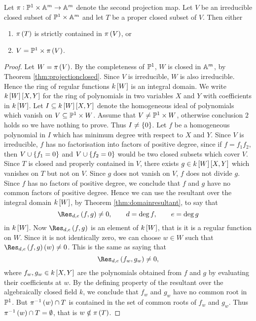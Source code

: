 \begin{lemma}
\label{lem:projectioneither}
Let $ \pi : \PP^1 \times \AA^m \to \AA^m $ denote the second projection map. Let $ V $ be an irreducible closed subset of $ \PP^1 \times \AA^m $ and let $ T $ be a proper closed subset of $ V $. Then either
\begin{enumerate}
\item $ \pi\br{T} $ is strictly contained in $ \pi\br{V} $, or
\item $ V = \PP^1 \times \pi\br{V} $.
\end{enumerate}
\end{lemma}

\pagebreak

\begin{proof}
Let $ W = \pi\br{V} $. By the completeness of $ \PP^1 $, $ W $ is closed in $ \AA^m $, by Theorem \ref{thm:projectionclosed}. Since $ V $ is irreducible, $ W $ is also irreducible. Hence the ring of regular functions $ k\sbr{W} $ is an integral domain. We write $ k\sbr{W}\sbr{X, Y} $ for the ring of polynomials in two variables $ X $ and $ Y $ with coefficients in $ k\sbr{W} $. Let $ I \subseteq k\sbr{W}\sbr{X, Y} $ denote the homogeneous ideal of polynomials which vanish on $ V \subseteq \PP^1 \times W $. Assume that $ V \ne \PP^1 \times W $, otherwise conclusion $ 2 $ holds so we have nothing to prove. Thus $ I \ne \cbr{0} $. Let $ f $ be a homogeneous polynomial in $ I $ which has minimum degree with respect to $ X $ and $ Y $. Since $ V $ is irreducible, $ f $ has no factorisation into factors of positive degree, since if $ f = f_1f_2 $, then $ V \cup \cbr{f_1 = 0} $ and $ V \cup \cbr{f_2 = 0} $ would be two closed subsets which cover $ V $. Since $ T $ is closed and properly contained in $ V $, there exists $ g \in k\sbr{W}\sbr{X, Y} $ which vanishes on $ T $ but not on $ V $. Since $ g $ does not vanish on $ V $, $ f $ does not divide $ g $. Since $ f $ has no factors of positive degree, we conclude that $ f $ and $ g $ have no common factors of positive degree. Hence we can use the resultant over the integral domain $ k\sbr{W} $, by Theorem \ref{thm:domainresultant}, to say that
$$ \Res_{d, e}\br{f, g} \ne 0, \qquad d = \deg f, \qquad e = \deg g $$
in $ k\sbr{W} $. Now $ \Res_{d, e}\br{f, g} $ is an element of $ k\sbr{W} $, that is it is a regular function on $ W $. Since it is not identically zero, we can choose $ w \in W $ such that $ \Res_{d, e}\br{f, g}\br{w} \ne 0 $. This is the same as saying that
$$ \Res_{d, e}\br{f_w, g_w} \ne 0, $$
where $ f_w, g_w \in k\sbr{X, Y} $ are the polynomials obtained from $ f $ and $ g $ by evaluating their coefficients at $ w $. By the defining property of the resultant over the algebraically closed field $ k $, we conclude that $ f_w $ and $ g_w $ have no common root in $ \PP^1 $. But $ \pi^{-1}\br{w} \cap T $ is contained in the set of common roots of $ f_w $ and $ g_w $. Thus $ \pi^{-1}\br{w} \cap T = \emptyset $, that is $ w \notin \pi\br{T} $.
\end{proof}

